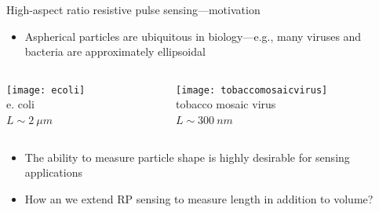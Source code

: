 \begin{frame}[c]{High-aspect ratio resistive pulse sensing---motivation}
 	
 	
 	\begin{itemize}
 		\item Aspherical particles are ubiquitous in biology---e.g., many viruses and bacteria are approximately ellipsoidal
 	\end{itemize}


	\begin{columns}[t]
		\begin{column}[T]{2.5in}
			{\centering
				\texttt{[image: ecoli]} \\
				e. coli \\
				$L\sim \SI{2}{\mu m}$ \\
				\par
			}
		\end{column}
		
		
		\begin{column}[T]{2.5in}
			{\centering
				\texttt{[image: tobaccomosaicvirus]} \\
				tobacco mosaic virus \\
				$L\sim \SI{300}{nm}$ \\
				\par
			}
		\end{column}
	

	\end{columns}

	\begin{itemize}
		\item The ability to measure particle shape is highly desirable for sensing applications
 		\item How an we extend RP sensing to measure length in addition to volume?
 	\end{itemize}
	

\end{frame}





